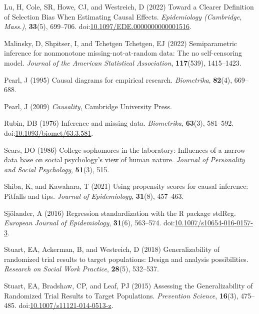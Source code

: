 \documentclass[
  single column]{article}
\newlength{\cslhangindent}
\newenvironment{CSLReferences}[2] %
 {\begin{list}{}{%
  \setlength{\itemindent}{0pt}
  \setlength{\leftmargin}{0pt}
  \setlength{\parsep}{0pt}
  \ifodd #1
   \setlength{\leftmargin}{\cslhangindent}
   \setlength{\itemindent}{-1\cslhangindent}
  \fi
  \setlength{\itemsep}{#2\baselineskip}}}
 {\end{list}}
\begin{document}
\begin{CSLReferences}{1}{0}
Lu, H, Cole, SR, Howe, CJ, and Westreich, D (2022) Toward a Clearer
Definition of Selection Bias When Estimating Causal Effects.
\emph{Epidemiology (Cambridge, Mass.)}, \textbf{33}(5), 699--706.
doi:\href{https://doi.org/10.1097/EDE.0000000000001516}{10.1097/EDE.0000000000001516}.

Malinsky, D, Shpitser, I, and Tchetgen Tchetgen, EJ (2022)
Semiparametric inference for nonmonotone missing-not-at-random data: The
no self-censoring model. \emph{Journal of the American Statistical
Association}, \textbf{117}(539), 1415--1423.

Pearl, J (1995) Causal diagrams for empirical research.
\emph{Biometrika}, \textbf{82}(4), 669--688.

Pearl, J (2009) \emph{Causality}, Cambridge University Press.

Rubin, DB (1976) Inference and missing data. \emph{Biometrika},
\textbf{63}(3), 581--592.
doi:\href{https://doi.org/10.1093/biomet/63.3.581}{10.1093/biomet/63.3.581}.

Sears, DO (1986) College sophomores in the laboratory: Influences of a
narrow data base on social psychology's view of human nature.
\emph{Journal of Personality and Social Psychology}, \textbf{51}(3),
515.

Shiba, K, and Kawahara, T (2021) Using propensity scores for causal
inference: Pitfalls and tips. \emph{Journal of Epidemiology},
\textbf{31}(8), 457--463.

Sjölander, A (2016) Regression standardization with the R package
stdReg. \emph{European Journal of Epidemiology}, \textbf{31}(6),
563--574.
doi:\href{https://doi.org/10.1007/s10654-016-0157-3}{10.1007/s10654-016-0157-3}.

Stuart, EA, Ackerman, B, and Westreich, D (2018) Generalizability of
randomized trial results to target populations: Design and analysis
possibilities. \emph{Research on Social Work Practice}, \textbf{28}(5),
532--537.

Stuart, EA, Bradshaw, CP, and Leaf, PJ (2015) Assessing the
Generalizability of Randomized Trial Results to Target Populations.
\emph{Prevention Science}, \textbf{16}(3), 475--485.
doi:\href{https://doi.org/10.1007/s11121-014-0513-z}{10.1007/s11121-014-0513-z}.


\end{CSLReferences}
\end{document}
